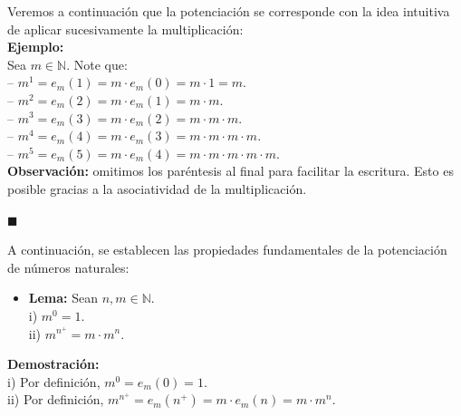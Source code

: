\documentclass[10 pt]{article}
\begin{document}
\Large{Veremos a continuación que la potenciación se corresponde con la idea intuitiva de aplicar sucesivamente la multiplicación:} \\

\Large{\textbf{Ejemplo:}} \\

\Large{Sea $m \in \mathbb N$. Note que: \\

-- $m^1=e_m(1)=m \cdot e_m(0)=m \cdot 1=m$. \\

-- $m^2=e_m(2)=m \cdot e_m(1)=m \cdot m$. \\

-- $m^3=e_m(3)=m \cdot e_m(2)=m \cdot m \cdot m$. \\

-- $m^4=e_m(4)=m \cdot e_m(3)=m \cdot m \cdot m \cdot m$. \\

-- $m^5=e_m(5)=m \cdot e_m(4)=m \cdot m \cdot m \cdot m \cdot m$.} \\

\Large{\textbf{Observación:} omitimos los paréntesis al final para facilitar la escritura. Esto es posible gracias a la asociatividad de la multiplicación.} \\

\begin{flushright}
    $\blacksquare$
\end{flushright}

\Large{A continuación, se establecen las propiedades fundamentales de la potenciación de números naturales:} \\

\begin{itemize}
\item \Large{\textbf{Lema:} Sean $n,m \in \mathbb N$. \\

i) $m^0=1$. \\

ii) $m^{n^+}=m \cdot m^n$.} \\
\end{itemize}

\Large{\textbf{Demostración:} \\

i) Por definición, $m^0=e_m(0)=1$. \\

ii) Por definición, $m^{n^+}=e_m(n^+)=m \cdot e_m(n)=m \cdot m^n$.} \\
\end{document}
